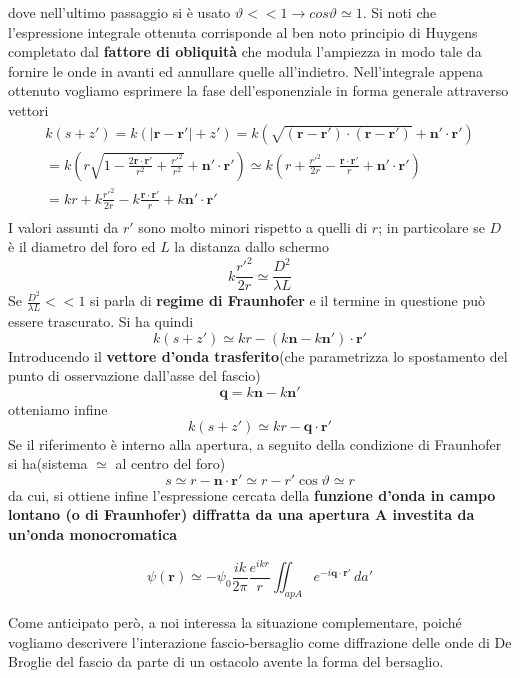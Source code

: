 dove nell'ultimo passaggio si è usato
\(\vartheta << 1 \rightarrow cos \vartheta \simeq 1\). Si noti che
l'espressione integrale ottenuta corrisponde al ben noto principio di
Huygens completato dal \textbf{fattore di obliquità} che modula
l'ampiezza in modo tale da fornire le onde in avanti ed annullare quelle
all'indietro.
Nell'integrale appena ottenuto vogliamo esprimere la fase dell'esponenziale in forma generale attraverso vettori \begin{gather*}
	k(s + z') = k(|\bm{r}-\bm{r'}|+z') = k \left(\sqrt{(\bm{r}-\bm{r'})\cdot(\bm{r}-\bm{r'})}+\bm{n}' \cdot \bm{r'}\right)\\
	= k\left(r \sqrt{1 - \frac{2 \bm{r}\cdot \bm{r'}}{r^2} + \frac{r'^2}{r^2}} + \bm{n}' \cdot \bm{r'}\right) \simeq k\left( r + \frac{r'^2}{2r} - \frac{ \bm{r}\cdot \bm{r'}}{r} + \bm{n}' \cdot \bm{r'}\right)\\
	= k r + k \frac{r'^2}{2r} - k \frac{ \bm{r}\cdot \bm{r'}}{r} + k \bm{n}' \cdot \bm{r'}\\
\end{gather*}
I valori assunti da \(r'\) sono molto minori rispetto a quelli di
\(r\); in particolare se \(D\) è il diametro del foro ed \(L\) la
distanza dallo schermo
\[
	k \frac{r'^2}{2r} \simeq \frac{D^2}{\lambda L}
\]
Se \(\frac{D^2}{\lambda L} << 1\) si parla di \textbf{regime di
Fraunhofer} e il termine in questione può essere trascurato. Si ha
quindi \[
		   k(s+z') \simeq kr - (k \bm{n} - k \bm{n}') \cdot \bm{r}'
\] Introducendo il \textbf{vettore d'onda trasferito}(che parametrizza
lo spostamento del punto di osservazione dall'asse del fascio) \[
																   \bm{q} = k \bm{n} - k \bm{n}'
\] otteniamo infine \[
						k(s+ z') \simeq kr - \bm{q} \cdot \bm{r}'
\] Se il riferimento è interno alla apertura, a seguito della condizione
di Fraunhofer si ha(sistema \(\simeq\) al centro del foro) \[
															   s \simeq r - \bm{n} \cdot \bm{r'} \simeq r - r' \cos \vartheta \simeq r
\]
da cui, si ottiene infine l'espressione cercata della \textbf{funzione
d'onda in campo lontano (o di Fraunhofer) diffratta da una apertura A
investita da un'onda monocromatica}

\begin{equation}
	\psi(\bm{r}) \simeq - \psi_0 \frac{ik}{2 \pi} \frac{e^{ikr}}{r}
	\iint_{ap A} e^{-i \bm{q} \cdot \bm{r}'}\, da'
\end{equation}

Come anticipato però, a noi interessa la situazione complementare,
poiché vogliamo descrivere l'interazione fascio-bersaglio come
diffrazione delle onde di De Broglie del fascio da parte di un ostacolo
avente la forma del bersaglio.

